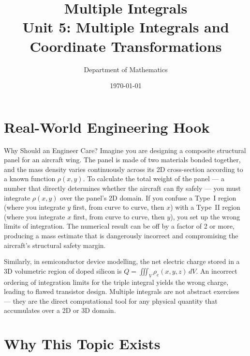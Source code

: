 \documentclass[12pt,a4paper]{article}
\title{\textbf{Multiple Integrals} \\ \large Unit 5: Multiple Integrals and Coordinate Transformations}
\author{Department of Mathematics}
\date{\today}
\begin{document}
\maketitle
\tableofcontents
\newpage

\section{Real-World Engineering Hook}

\begin{curiositybox}{Why Should an Engineer Care?}
Imagine you are designing a composite structural panel for an aircraft wing. The panel is made of two materials bonded together, and the mass density varies continuously across its 2D cross-section according to a known function \(\rho(x,y)\). To calculate the total weight of the panel --- a number that directly determines whether the aircraft can fly safely --- you must integrate \(\rho(x,y)\) over the panel's 2D domain. If you confuse a Type~I region (where you integrate \(y\) first, from curve to curve, then \(x\)) with a Type~II region (where you integrate \(x\) first, from curve to curve, then \(y\)), you set up the wrong limits of integration. The numerical result can be off by a factor of 2 or more, producing a mass estimate that is dangerously incorrect and compromising the aircraft's structural safety margin.

Similarly, in semiconductor device modelling, the net electric charge stored in a 3D volumetric region of doped silicon is \(Q = \iiint_V \rho_e(x,y,z)\,dV\). An incorrect ordering of integration limits for the triple integral yields the wrong charge, leading to flawed transistor design. Multiple integrals are not abstract exercises --- they are the direct computational tool for any physical quantity that accumulates over a 2D or 3D domain.
\end{curiositybox}

\section{Why This Topic Exists}
\end{document}
